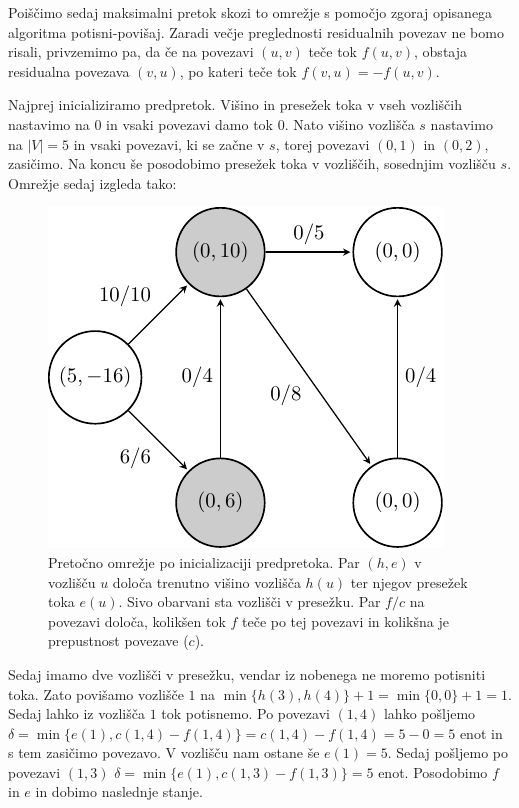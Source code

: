 \documentclass[mat1]{fmfdelo}
\begin{document}
Poiščimo sedaj maksimalni pretok skozi to omrežje s pomočjo zgoraj opisanega algoritma potisni-povišaj.
Zaradi večje preglednosti residualnih povezav ne bomo risali, privzemimo pa, da če na povezavi $(u,v)$ teče tok $f(u,v)$,
obstaja residualna povezava $(v,u)$, po kateri teče tok $f(v,u) = -f(u,v)$.

Najprej inicializiramo predpretok. Višino in presežek toka v vseh vozliščih nastavimo na $0$ in vsaki povezavi
damo tok $0$. Nato višino vozlišča $s$ nastavimo na $|V| = 5$ in vsaki povezavi, ki se začne v $s$, torej
povezavi $(0,1)$ in $(0,2)$, zasičimo. Na koncu še posodobimo presežek toka v vozliščih, sosednjim vozlišču $s$.
Omrežje sedaj izgleda tako:

\begin{figure}[H]
  \centering
  \includegraphics{images/graf2-2.pdf}
  \caption{Pretočno omrežje po inicializaciji predpretoka. Par $(h, e)$ v vozlišču $u$ določa trenutno višino vozlišča $h(u)$ ter njegov presežek toka $e(u)$. Sivo obarvani sta vozlišči v presežku. Par $f/c$ na povezavi določa, kolikšen tok $f$ teče po tej povezavi in kolikšna je prepustnost povezave ($c$).}
\end{figure}

Sedaj imamo dve vozlišči v presežku, vendar iz nobenega ne moremo potisniti toka. Zato povišamo vozlišče $1$ na $\min \{h(3), h(4)\} + 1 = \min \{0, 0\} + 1 = 1$. Sedaj lahko iz vozlišča $1$ tok potisnemo.
Po povezavi $(1,4)$ lahko pošljemo $\delta = \min\{e(1), c(1,4) - f(1,4)\} = c(1,4) - f(1,4) = 5 - 0 = 5$ enot in s tem zasičimo povezavo. V vozlišču nam ostane še $e(1) = 5$. Sedaj pošljemo po povezavi
$(1,3)$ $\delta = \min \{e(1), c(1,3) - f(1,3)\} = 5$ enot. Posodobimo $f$ in $e$ in dobimo naslednje stanje.
\end{document}
